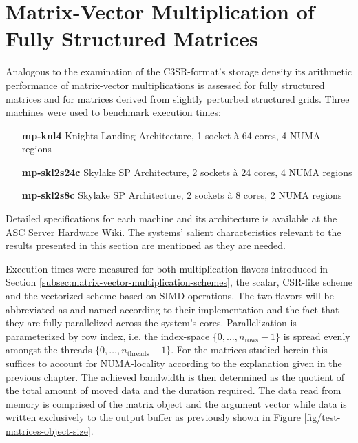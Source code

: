 
  \section{Matrix-Vector Multiplication of Fully Structured Matrices} \label{sec:mvm-structured}

    Analogous to the examination of the C3SR-format's storage density its arithmetic performance of matrix-vector
    multiplications is assessed for fully structured matrices and for matrices derived from slightly perturbed
    structured grids. Three machines were used to benchmark execution times: 

    \begin{itemize}[leftmargin=5cm]
      \item[\textbf{mp-knl4}] {Knights Landing Architecture, 1 socket à 64 cores, 4 NUMA regions}
      \item[\textbf{mp-skl2s24c}] {Skylake SP Architecture, 2 sockets à 24 cores, 4 NUMA regions}
      \item[\textbf{mp-skl2s8c}] {Skylake SP Architecture, 2 sockets à 8 cores, 2 NUMA regions} 
    \end{itemize}

    Detailed specifications for each machine and its architecture is available at the \href{\ascWiki}{ASC Server
    Hardware Wiki}. The systems' salient characteristics relevant to the results presented in this section are mentioned
    as they are needed. 

    Execution times were measured for both multiplication flavors introduced in Section
    \ref{subsec:matrix-vector-multiplication-schemes}, the scalar, CSR-like scheme and the vectorized scheme based on
    SIMD operations. The two flavors will be abbreviated as  and  named according to
    their implementation and the fact that they are fully parallelized across the system's cores. Parallelization is
    parameterized by row index, i.e. the index-space $\{0, \ldots, n_{\text{rows}} - 1\}$ is spread evenly amongst the
    threads $\{0, \ldots, n_\text{threads} - 1\}$. For the matrices studied herein this suffices to account for
    NUMA-locality according to the explanation given in the previous chapter. The achieved bandwidth is then determined
    as the quotient of the total amount of moved data and the duration required. The data read from memory is comprised
    of the matrix object and the argument vector while data is written exclusively to the output buffer as previously
    shown in Figure \ref{fig/test-matrices-object-size}.

